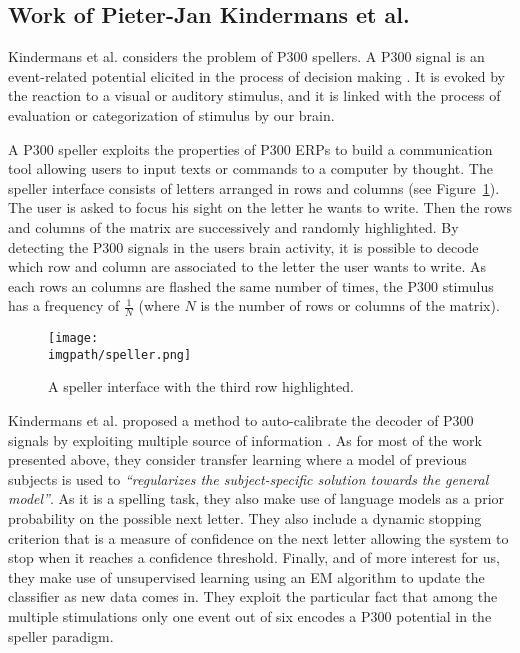 \subsection{Work of Pieter-Jan Kindermans et al.}
\label{chapter:related:bci:kindermans}

Kindermans et al. considers the problem of P300 spellers. A P300 signal is an event-related potential elicited in the process of decision making \cite{polich2003theoretical}. It is evoked by the reaction to a visual or auditory stimulus, and it is linked with the process of evaluation or categorization of stimulus by our brain. 

A P300 speller exploits the properties of P300 ERPs to build a communication tool allowing users to input texts or commands to a computer by thought. The speller interface consists of letters arranged in rows and columns (see Figure~\ref{fig:speller}). The user is asked to focus his sight on the letter he wants to write. Then the rows and columns of the matrix are successively and randomly highlighted. By detecting the P300 signals in the users brain activity, it is possible to decode which row and column are associated to the letter the user wants to write. As each rows an columns are flashed the same number of times, the P300 stimulus has a frequency of $\frac{1}{N}$ (where $N$ is the number of rows or columns of the matrix).

\begin{figure}[!htbp]
  \centering
  \texttt{[image: \\imgpath/speller.png]}
  \caption{A speller interface with the third row highlighted.}
  \label{fig:speller}
\end{figure}

Kindermans et al. proposed a method to auto-calibrate the decoder of P300 signals by exploiting multiple source of information \cite{kindermans2012b,kindermans2014integrating}. As for most of the work presented above, they consider transfer learning where a model of previous subjects is used to \textit{``regularizes the subject-specific solution towards the general model''}. As it is a spelling task, they also make use of language models as a prior probability on the possible next letter. They also include a dynamic stopping criterion that is a measure of confidence on the next letter allowing the system to stop when it reaches a confidence threshold. Finally, and of more interest for us, they make use of unsupervised learning using an EM algorithm to update the classifier as new data comes in. They exploit the particular fact that among the multiple stimulations only one event out of six encodes a P300 potential in the speller paradigm.

